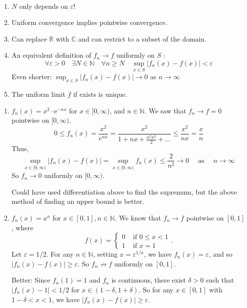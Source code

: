 \documentclass[a4paper]{article}
\renewcommand{\epsilon}{\varepsilon}
\begin{document}
\begin{remark}\
    \begin{enumerate}
        \item $ N $ only depends on $\epsilon$!
        \item Uniform convergence implies pointwise convergence.
        \item Can replace $\mathbb{R}$ with $\mathbb{C}$ and can restrict to a subset of the domain.
        \item An equivalent definition of $f_{n} \rightarrow f$ uniformly on $S$ :
        \[
        \forall \varepsilon>0 \quad \exists N \in \mathbb{N} \quad \forall n \geqslant N \quad \sup _{x \in S}\left|f_{n}(x)-f(x)\right|<\varepsilon
        \]
        Even shorter: $\sup _{x \in S}\left|f_{n}(x)-f(x)\right| \rightarrow 0$ as $n \rightarrow \infty$
        \item The uniform limit $f$ if exists is unique.
    \end{enumerate}
\end{remark}

\begin{example}
\begin{enumerate}
    \item $f_{n}(x)=x^{2} \cdot \mathrm{e}^{-n x}$ for $x \in[0, \infty)$, and $n \in \mathbb{N}$. We saw that $f_{n} \rightarrow f=0$ pointwise on $[0, \infty)$.
    \[
    0 \leqslant f_{n}(x)=\frac{x^{2}}{e^{n x}}=\frac{x^{2}}{1+n x+\frac{n^{2} x^{2}}{2}+\ldots} \leqslant \frac{x^{2}}{n x}=\frac{x}{n}
    \]
    Thus,
    \[
    \sup _{x \in[0, \infty)}\left|f_{n}(x)-f(x)\right|=\sup _{x \in[0, \infty)} f_{n}(x) \leqslant \frac{2}{n^{2}} \rightarrow 0 \quad \text { as } \quad n \rightarrow \infty
    \]
    So $f_{n} \rightarrow 0$ uniformly on $[0, \infty)$.

    Could have used differentiation above to find the supremum, but the above method of finding an upper bound is better.
    \item $f_{n}(x)=x^{n}$ for $x \in[0,1], n \in \mathbb{N}$.
    We know that $f_{n} \rightarrow f$ pointwise on $[0,1]$, where
    \[
        f(x)= \begin{cases}0 & \text { if } 0 \leqslant x<1 \\ 1 & \text { if } x=1\end{cases}.
    \]
    Let $\varepsilon=1 / 2$. For any $n \in \mathbb{N}$, setting $x=\varepsilon^{1 / n}$, we have $f_{n}(x)=\varepsilon$, and so $\left|f_{n}(x)-f(x)\right| \geqslant \varepsilon$. So $f_{n} \not \rightarrow  f$ uniformly on $[0,1]$.

    Better: Since $f_{n}(1)=1$ and $f_{n}$ is continuous, there exist $\delta>0$ such that $\left|f_{n}(x)-1\right|<1 / 2$ for $x \in(1-\delta, 1+\delta)$. So for any $x \in[0,1]$ with $1-\delta<x<1$, we have $\left|f_{n}(x)-f(x)\right| \geqslant \varepsilon$.
\end{enumerate}
\end{example}
\end{document}
